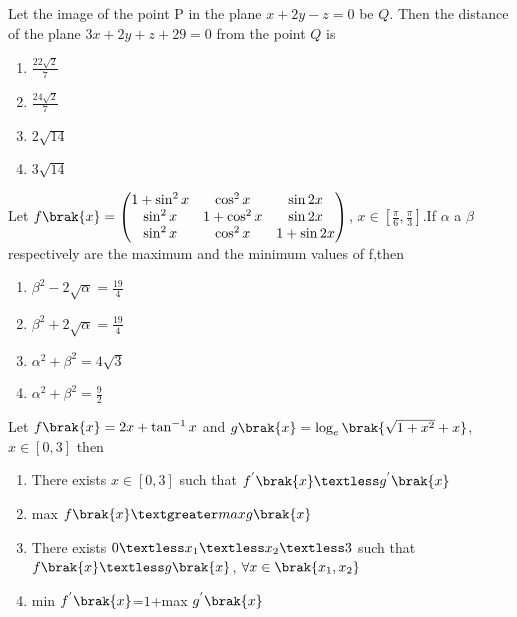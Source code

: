 \iffalse
\title{Assignment 3}
\author{AI24BTECH11018}
\section{mcq-single}
\fi

\item Let the image of the point P in the plane $x+2y-z=0$ be $Q$. Then the distance of the plane 
$3x + 2y + z + 29 = 0$ from the point $Q$ is
\begin{enumerate}
    \item $\frac{22\sqrt{2}}{7}$
    \item $\frac{24\sqrt{2}}{7}$
    \item $2\sqrt{14}$
    \item $3\sqrt{14}$
\end{enumerate}
\hfill{}
\item Let $f\brak{x}=\begin{pmatrix}
1+\sin^2{x} & \cos^2{x} & \sin 2x \\
\sin^2{x} & 1+\cos^2{x} & \sin 2x \\
\sin^2{x} & \cos^2{x} & 1+\sin 2x
\end{pmatrix}$, $x\in [\frac{\pi}{6},\frac{\pi}{3}]$.If $\alpha$ a $\beta$ respectively are the maximum and the minimum values of f,then
\begin{enumerate}
    \item $\beta^2-2\sqrt{\alpha}=\frac{19}{4}$
    \item $\beta^2+2\sqrt{\alpha}=\frac{19}{4}$
    \item $\alpha^2 + \beta^2 = 4\sqrt{3}$
    \item $\alpha^2 + \beta^2 = \frac{9}{2}$
\end{enumerate}
\hfill{}
\item Let $f\brak{x}=2x+\tan^{-1}x$ and $g\brak{x}=\log_{e}\brak{\sqrt{1+x^2}+x}$, $x\in [0,3]$ then 
\begin{enumerate}
    \item There exists $x\in [0,3]$ such that $f^{'}\brak{x} \textless g^{'}\brak{x}$
    \item max $f\brak{x} \textgreater max g\brak{x}$
    \item There exists $0 \textless x_1 \textless x_2\textless 3$ such that $f\brak{x} \textless g\brak{x}$, $\forall x\in \brak{x_1,x_2}$
    \item min $f^{'}\brak{x}$=$1$+max $ g^{'}\brak{x}$
\end{enumerate}
